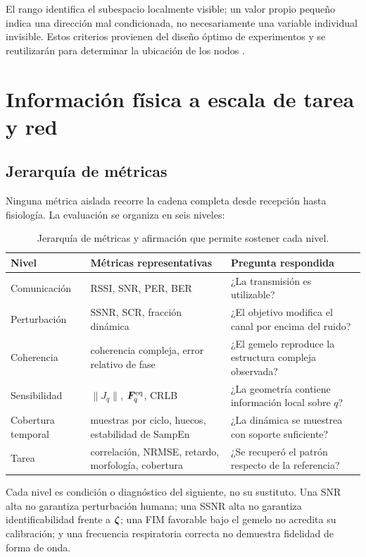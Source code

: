 El rango identifica el subespacio localmente visible; un valor propio pequeño indica una dirección mal condicionada, no necesariamente una variable individual invisible. Estos criterios provienen del diseño óptimo de experimentos y se reutilizarán para determinar la ubicación de los nodos \citep{Pukelsheim2006}.

\section{Información física a escala de tarea y red}

\subsection{Jerarquía de métricas}

Ninguna métrica aislada recorre la cadena completa desde recepción hasta fisiología.
La evaluación se organiza en seis niveles:
\begin{table}[htbp]
\centering\small
\caption{Jerarquía de métricas y afirmación que permite sostener cada nivel.}
\label{tab:metric_hierarchy}
\begin{tabularx}{\textwidth}{P{2.4cm}P{4.1cm}L}
\toprule
Nivel & Métricas representativas & Pregunta respondida\\
\midrule
Comunicación & RSSI, SNR, PER, BER & ¿La transmisión es utilizable?\\
Perturbación & SSNR, SCR, fracción dinámica & ¿El objetivo modifica el canal por
encima del ruido?\\
Coherencia & coherencia compleja, error relativo de fase & ¿El gemelo reproduce
la estructura compleja observada?\\
Sensibilidad & $\|J_q\|$, $\bm{F}_q^{\rm eq}$, CRLB & ¿La geometría contiene
información local sobre $q$?\\
Cobertura temporal & muestras por ciclo, huecos, estabilidad de SampEn & ¿La
dinámica se muestrea con soporte suficiente?\\
Tarea & correlación, NRMSE, retardo, morfología, cobertura & ¿Se recuperó el patrón
respecto de la referencia?\\
\bottomrule
\end{tabularx}
\end{table}

Cada nivel es condición o diagnóstico del siguiente, no su sustituto. Una SNR alta
no garantiza perturbación humana; una SSNR alta no garantiza identificabilidad
frente a \(\bm{\zeta}\); una FIM favorable bajo el gemelo no acredita su calibración;
y una frecuencia respiratoria correcta no demuestra fidelidad de forma de onda.


